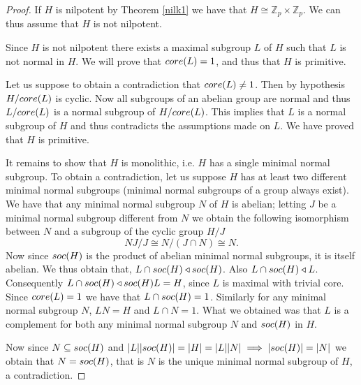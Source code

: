 \begin{proof}
    If $H$ is nilpotent by Theorem \ref{nilk1} we have that $H \cong \mathbb{Z}_p \times \mathbb{Z}_p$. We can thus assume that $H$ is not nilpotent.

    Since $H$ is not nilpotent there exists a maximal subgroup $L$ of $H$ such that $L$ is not normal in $H$. We will prove that $core({L}) = 1$, and thus that $H$ is primitive. 
    
    Let us suppose to obtain a contradiction that $core({L}) \ne 1$. Then by hypothesis $H/core({L})$ is cyclic. Now all subgroups of an abelian group are normal and thus $L/core({L})$ is a normal subgroup of $H/core({L})$. This implies that $L$ is a normal subgroup of $H$ and thus contradicts the assumptions made on $L$. We have proved that $H$ is primitive.

    It remains to show that $H$ is monolithic, i.e. $H$ has a single minimal normal subgroup. To obtain a contradiction, let us suppose $H$ has at least two different minimal normal subgroups (minimal normal subgroups of a group always exist). We have that any minimal normal subgroup $N$ of $H$ is abelian; letting $J$ be a minimal normal subgroup different from $N$ we obtain the following isomorphism between $N$ and a subgroup of the cyclic group $H/J$
    $$
        NJ/J \cong N/(J \cap N) \cong N.
    $$
    Now since $soc {(H)}$ is the product of abelian minimal normal subgroups, it is itself abelian. We thus obtain that, $L \cap soc {(H)} \triangleleft soc {(H)}$. Also $L \cap soc {(H)} \triangleleft L$. Consequently $L \cap soc {(H)} \triangleleft soc {(H)}L = H$, since $L$ is maximal with trivial core.
    Since $core({L}) = 1$ we have that $L \cap soc {(H)} = 1$. Similarly for any minimal normal subgroup $N$, $LN=H$ and $L \cap N = 1$. What we obtained was that $L$ is a complement for both any minimal normal subgroup $N$ and $soc {(H)}$ in $H$.

    Now since $N \subseteq soc {(H)}$ and $| L || soc {(H)} | = | H | = | L || N | \implies | soc {(H)} | = | N |$ we obtain that $N = soc {(H)}$, that is $N$ is the unique minimal normal subgroup of $H$, a contradiction.
\end{proof}